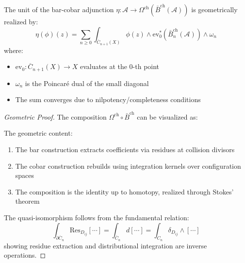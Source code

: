\begin{theorem}\label{thm:geom-unit}
The unit of the bar-cobar adjunction $\eta: \mathcal{A} \to \Omega^{\text{ch}}(\bar{B}^{\text{ch}}(\mathcal{A}))$ is geometrically realized by:
\[
\eta(\phi)(z) = \sum_{n \geq 0} \int_{\overline{C}_{n+1}(X)} \phi(z) \wedge \text{ev}^*_{0}\left(\bar{B}_n^{\text{ch}}(\mathcal{A})\right) \wedge \omega_n
\]
where:
\begin{itemize}
\item $\text{ev}_0: \overline{C}_{n+1}(X) \to X$ evaluates at the 0-th point
\item $\omega_n$ is the Poincaré dual of the small diagonal
\item The sum converges due to nilpotency/completeness conditions
\end{itemize}
\end{theorem}

\begin{proof}[Geometric Proof]
The composition $\Omega^{\text{ch}} \circ \bar{B}^{\text{ch}}$ can be visualized as:

\begin{center}
\end{center}

The geometric content:
\begin{enumerate}
\item The bar construction extracts coefficients via residues at collision divisors
\item The cobar construction rebuilds using integration kernels over configuration spaces
\item The composition is the identity up to homotopy, realized through Stokes' theorem
\end{enumerate}

The quasi-isomorphism follows from the fundamental relation:
\[
\int_{\partial \overline{C}_n} \text{Res}_{D_{ij}}[\cdots] = \int_{\overline{C}_n} d[\cdots] = \int_{C_n} \delta_{D_{ij}} \wedge [\cdots]
\]
showing residue extraction and distributional integration are inverse operations.
\end{proof}

